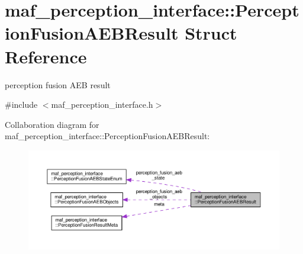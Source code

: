 \hypertarget{structmaf__perception__interface_1_1PerceptionFusionAEBResult}{}\section{maf\+\_\+perception\+\_\+interface\+:\+:Perception\+Fusion\+A\+E\+B\+Result Struct Reference}
\label{structmaf__perception__interface_1_1PerceptionFusionAEBResult}


perception fusion A\+EB result  




{\ttfamily \#include $<$maf\+\_\+perception\+\_\+interface.\+h$>$}



Collaboration diagram for maf\+\_\+perception\+\_\+interface\+:\+:Perception\+Fusion\+A\+E\+B\+Result\+:\nopagebreak
\begin{figure}[H]
\begin{center}
\leavevmode
\includegraphics[width=350pt]{structmaf__perception__interface_1_1PerceptionFusionAEBResult__coll__graph}
\end{center}
\end{figure}
